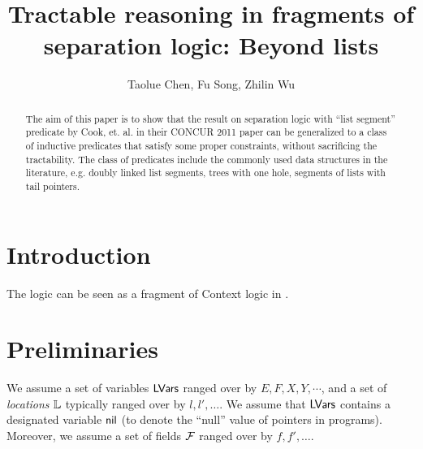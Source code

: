 \documentclass{llncs}
\title{Tractable reasoning in fragments of separation logic: Beyond lists}
\author{Taolue Chen, Fu Song, Zhilin Wu}
\newcommand{\zhilin}[1]{\color{red} {ZL: #1 :LZ} \color{black}}
\begin{document}
\maketitle

\begin{abstract}

The aim of this paper is to show that the result on separation logic with ``list segment'' predicate by Cook, et. al. in their CONCUR 2011 paper can be generalized to a class of inductive predicates that satisfy some proper constraints, without sacrificing the tractability. The class of predicates include the commonly used data structures in the literature, e.g. doubly linked list segments, trees with one hole, segments of lists with tail pointers.

\end{abstract}

\section{Introduction}

The logic can be seen as a fragment of Context logic in \cite{CGZ05}.

%


\section{Preliminaries}

We assume a set of  variables $\mathsf{LVars}$ ranged over by  $E,F,X,Y,\cdots$, and a set of \emph{locations} ${\mathbb L}$ typically ranged over by $l,l',\dots$. We assume that $\mathsf{LVars}$ contains a designated variable ${\sf nil}$ (to denote the ``null'' value of pointers in programs). Moreover, we assume a set of fields $\mathcal{F}$ ranged over by $f, f',\dots$.
\end{document}
